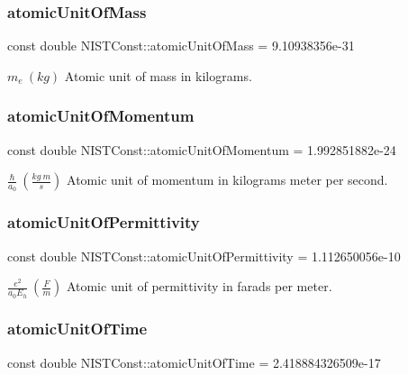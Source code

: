 \subsubsection{\texorpdfstring{atomic\+Unit\+Of\+Mass}{atomicUnitOfMass}}
{\footnotesize\ttfamily const double N\+I\+S\+T\+Const\+::atomic\+Unit\+Of\+Mass = 9.\+10938356e-\/31}

$m_e \ (kg)$ Atomic unit of mass in kilograms. \mbox{\label{group___n_i_s_t_const-_atomic_unit_gae70262618755d765a1de59f471b56040}} 
\subsubsection{\texorpdfstring{atomic\+Unit\+Of\+Momentum}{atomicUnitOfMomentum}}
{\footnotesize\ttfamily const double N\+I\+S\+T\+Const\+::atomic\+Unit\+Of\+Momentum = 1.\+992851882e-\/24}

$\frac{\hbar}{a_0} \ (\frac{kg\ m}{s})$ Atomic unit of momentum in kilograms meter per second. \mbox{\label{group___n_i_s_t_const-_atomic_unit_ga0b7518cf6058bb899c64b32b43bda955}} 
\subsubsection{\texorpdfstring{atomic\+Unit\+Of\+Permittivity}{atomicUnitOfPermittivity}}
{\footnotesize\ttfamily const double N\+I\+S\+T\+Const\+::atomic\+Unit\+Of\+Permittivity = 1.\+112650056e-\/10}

$\frac{e^2}{a_0 E_h} \ (\frac{F}{m})$ Atomic unit of permittivity in farads per meter. \mbox{\label{group___n_i_s_t_const-_atomic_unit_ga6181f64b8320afb6ecacc9c7f7e27afa}} 
\subsubsection{\texorpdfstring{atomic\+Unit\+Of\+Time}{atomicUnitOfTime}}
{\footnotesize\ttfamily const double N\+I\+S\+T\+Const\+::atomic\+Unit\+Of\+Time = 2.\+418884326509e-\/17}

